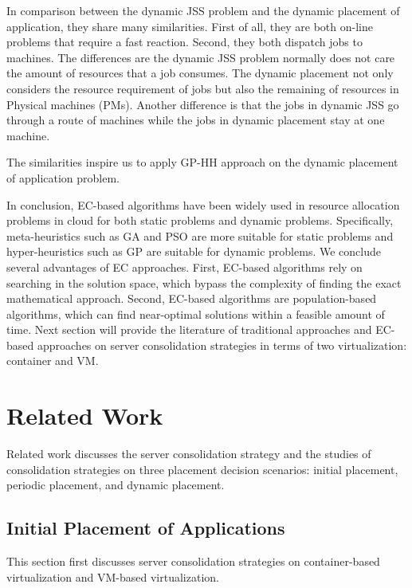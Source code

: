 In comparison between the dynamic JSS problem and the dynamic placement of application, they share many similarities. First of all, they are both on-line problems that require a fast reaction. Second, they both dispatch jobs to machines. The differences are the dynamic JSS problem normally does not care the amount of resources that a job consumes. The dynamic placement not only considers the resource requirement of jobs but also the remaining of resources in Physical machines (PMs). Another difference is that the jobs in dynamic JSS go through a route of machines while the jobs in dynamic placement stay at one machine.

The similarities inspire us to apply GP-HH approach on the dynamic placement of application problem.

\vspace{5mm}


In conclusion, EC-based algorithms have been widely used in resource allocation problems in cloud for both static problems and dynamic problems. Specifically, meta-heuristics such as GA and PSO are more suitable for static problems and hyper-heuristics such as GP are suitable for dynamic problems. 
We conclude several advantages of EC approaches. First, EC-based algorithms rely on searching in the solution space, which bypass the complexity of finding the exact mathematical approach. Second, EC-based algorithms are population-based algorithms, which can find near-optimal solutions within a feasible amount of time.
Next section will provide the literature of traditional approaches and EC-based approaches on server consolidation strategies in terms of two virtualization: container and VM. 


\section{Related Work}
\label{sec:related_work}
Related work discusses the server consolidation strategy and the studies of consolidation strategies on three placement decision scenarios: initial placement, periodic placement, and dynamic placement. 


\subsection{Initial Placement of Applications}
\label{sec:initial}

This section first discusses server consolidation strategies on container-based virtualization and VM-based virtualization.

